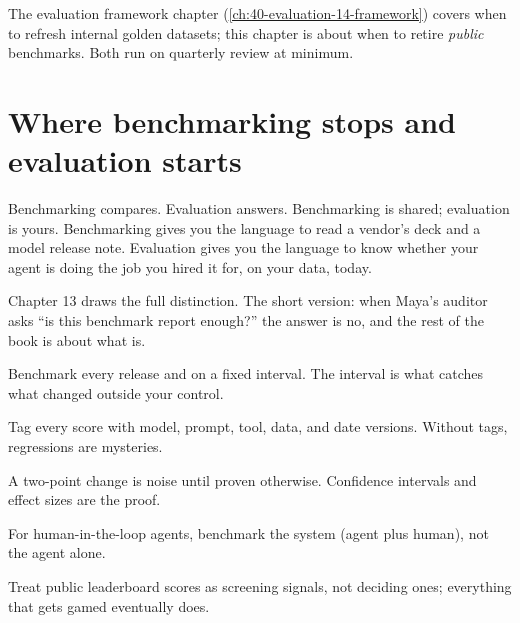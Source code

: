 The evaluation framework chapter (\autoref{ch:40-evaluation-14-framework}) covers when to refresh internal golden datasets; this chapter is about when to retire \textit{public} benchmarks. Both run on quarterly review at minimum.

\section{Where benchmarking stops and evaluation starts}

Benchmarking compares. Evaluation answers. Benchmarking is shared; evaluation is yours. Benchmarking gives you the language to read a vendor's deck and a model release note. Evaluation gives you the language to know whether your agent is doing the job you hired it for, on your data, today.

Chapter 13 draws the full distinction. The short version: when Maya's auditor asks ``is this benchmark report enough?'' the answer is no, and the rest of the book is about what is.

\TNrule

\stoptwocol

\begin{TNkeytakeaways}
\item Benchmark every release and on a fixed interval. The interval is what catches what changed outside your control.
\item Tag every score with model, prompt, tool, data, and date versions. Without tags, regressions are mysteries.
\item A two-point change is noise until proven otherwise. Confidence intervals and effect sizes are the proof.
\item For human-in-the-loop agents, benchmark the system (agent plus human), not the agent alone.
\item Treat public leaderboard scores as screening signals, not deciding ones; everything that gets gamed eventually does.
\end{TNkeytakeaways}

